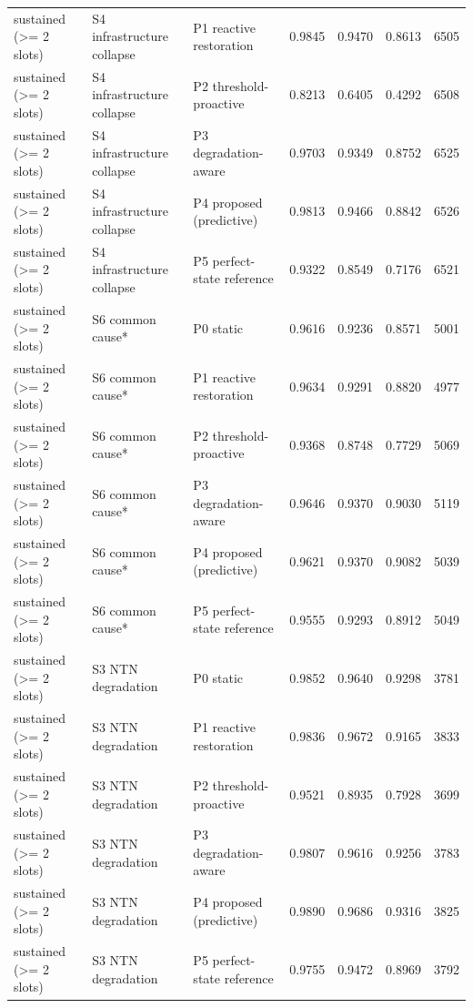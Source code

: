 \begin{tabular}{lllllll}
sustained (>= 2 slots) & S4 infrastructure collapse & P1 reactive restoration & 0.9845 & 0.9470 & 0.8613 & 6505 \\
sustained (>= 2 slots) & S4 infrastructure collapse & P2 threshold-proactive & 0.8213 & 0.6405 & 0.4292 & 6508 \\
sustained (>= 2 slots) & S4 infrastructure collapse & P3 degradation-aware & 0.9703 & 0.9349 & 0.8752 & 6525 \\
sustained (>= 2 slots) & S4 infrastructure collapse & P4 proposed (predictive) & 0.9813 & 0.9466 & 0.8842 & 6526 \\
sustained (>= 2 slots) & S4 infrastructure collapse & P5 perfect-state reference & 0.9322 & 0.8549 & 0.7176 & 6521 \\
sustained (>= 2 slots) & S6 common cause* & P0 static & 0.9616 & 0.9236 & 0.8571 & 5001 \\
sustained (>= 2 slots) & S6 common cause* & P1 reactive restoration & 0.9634 & 0.9291 & 0.8820 & 4977 \\
sustained (>= 2 slots) & S6 common cause* & P2 threshold-proactive & 0.9368 & 0.8748 & 0.7729 & 5069 \\
sustained (>= 2 slots) & S6 common cause* & P3 degradation-aware & 0.9646 & 0.9370 & 0.9030 & 5119 \\
sustained (>= 2 slots) & S6 common cause* & P4 proposed (predictive) & 0.9621 & 0.9370 & 0.9082 & 5039 \\
sustained (>= 2 slots) & S6 common cause* & P5 perfect-state reference & 0.9555 & 0.9293 & 0.8912 & 5049 \\
sustained (>= 2 slots) & S3 NTN degradation & P0 static & 0.9852 & 0.9640 & 0.9298 & 3781 \\
sustained (>= 2 slots) & S3 NTN degradation & P1 reactive restoration & 0.9836 & 0.9672 & 0.9165 & 3833 \\
sustained (>= 2 slots) & S3 NTN degradation & P2 threshold-proactive & 0.9521 & 0.8935 & 0.7928 & 3699 \\
sustained (>= 2 slots) & S3 NTN degradation & P3 degradation-aware & 0.9807 & 0.9616 & 0.9256 & 3783 \\
sustained (>= 2 slots) & S3 NTN degradation & P4 proposed (predictive) & 0.9890 & 0.9686 & 0.9316 & 3825 \\
sustained (>= 2 slots) & S3 NTN degradation & P5 perfect-state reference & 0.9755 & 0.9472 & 0.8969 & 3792 \\
\bottomrule
\end{tabular}
